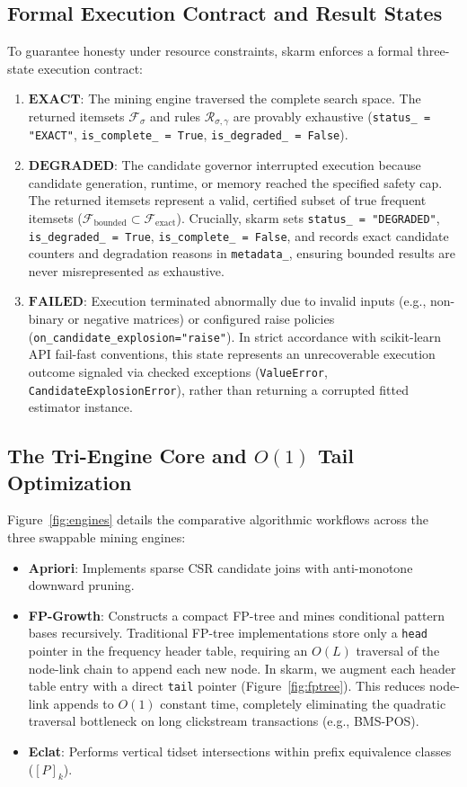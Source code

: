 \documentclass[twocolumn,10pt]{article}
\newcommand{\skarm}{\textsf{skarm}\xspace}
\begin{document}
\subsection{Formal Execution Contract and Result States}
\label{sec:result_states}
To guarantee honesty under resource constraints, \skarm enforces a formal three-state execution contract:
\begin{enumerate}
  \item $\mathbf{EXACT}$: The mining engine traversed the complete search space. The returned itemsets $\mathcal{F}_\sigma$ and rules $\mathcal{R}_{\sigma, \gamma}$ are provably exhaustive (\texttt{status\_ = "EXACT"}, \texttt{is\_complete\_ = True}, \texttt{is\_degraded\_ = False}).
  \item $\mathbf{DEGRADED}$: The candidate governor interrupted execution because candidate generation, runtime, or memory reached the specified safety cap. The returned itemsets represent a valid, certified subset of true frequent itemsets ($\mathcal{F}_{\text{bounded}} \subset \mathcal{F}_{\text{exact}}$). Crucially, \skarm sets \texttt{status\_ = "DEGRADED"}, \texttt{is\_degraded\_ = True}, \texttt{is\_complete\_ = False}, and records exact candidate counters and degradation reasons in \texttt{metadata\_}, ensuring bounded results are never misrepresented as exhaustive.
  \item $\mathbf{FAILED}$: Execution terminated abnormally due to invalid inputs (e.g., non-binary or negative matrices) or configured raise policies (\texttt{on\_candidate\_explosion="raise"}). In strict accordance with scikit-learn API fail-fast conventions, this state represents an unrecoverable execution outcome signaled via checked exceptions (\texttt{ValueError}, \texttt{CandidateExplosionError}), rather than returning a corrupted fitted estimator instance.
\end{enumerate}

\subsection{The Tri-Engine Core and $O(1)$ Tail Optimization}
Figure~\ref{fig:engines} details the comparative algorithmic workflows across the three swappable mining engines:
\begin{itemize}
  \item \textbf{Apriori}: Implements sparse CSR candidate joins with anti-monotone downward pruning.
  \item \textbf{FP-Growth}: Constructs a compact FP-tree and mines conditional pattern bases recursively. Traditional FP-tree implementations store only a \texttt{head} pointer in the frequency header table, requiring an $O(L)$ traversal of the node-link chain to append each new node. In \skarm, we augment each header table entry with a direct \texttt{tail} pointer (Figure~\ref{fig:fptree}). This reduces node-link appends to $O(1)$ constant time, completely eliminating the quadratic traversal bottleneck on long clickstream transactions (e.g., BMS-POS).
  \item \textbf{Eclat}: Performs vertical tidset intersections within prefix equivalence classes ($[P]_k$).
\end{itemize}
\end{document}
